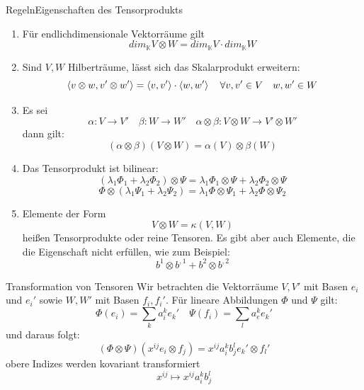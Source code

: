 \begin{Satz}{Regeln}{Eigenschaften des Tensorprodukts}
\begin{enumerate}
    \item Für endlichdimensionale Vektorräume gilt
    $$dim_{\mathbb{K}}V\otimes W = dim_{\mathbb{K}} V \cdot dim_{\mathbb{K}} W$$
    \item Sind $V,W$ Hilberträume, lässt sich das Skalarprodukt erweitern:
    $$\braket{v\otimes w, v'\otimes w'}=\braket{v,v'}\cdot \braket{w, w'} \quad \forall v,v'\in V\quad w,w'\in W$$
    \item Es sei $$\alpha: V\rightarrow V' \quad \beta:W\rightarrow W' \quad \alpha\otimes\beta: V\otimes W \rightarrow V'\otimes W'$$
    dann gilt:
    $$(\alpha\otimes\beta)(V\otimes W)=\alpha(V)\otimes \beta(W)$$
    \item Das Tensorprodukt ist bilinear:
    $$(\lambda_1\Phi_1+\lambda_2\Phi_2)\otimes \Psi = \lambda_1\Phi_1 \otimes \Psi + \lambda_2\Phi_2 \otimes \Psi$$
    $$\Phi\otimes (\lambda_1\Psi_1+ \lambda_2\Psi_2) = \lambda_1\Phi \otimes \Psi_1 + \lambda_2\Phi \otimes \Psi_2$$
    \item Elemente der Form
    $$V\otimes W=\kappa(V,W)$$
    heißen Tensorprodukte oder reine Tensoren. Es gibt aber auch Elemente, die die Eigenschaft nicht erfüllen, wie zum Beispiel:
    $$b^1\otimes b^{,1}+b^2\otimes b^{,2}$$
\end{enumerate}
\end{Satz}
\begin{Def}{Transformation von Tensoren}
    Wir betrachten die Vektorräume $V,V'$ mit Basen $e_i$ und $e_i'$ sowie $W, W'$ mit Basen $f_i, f_i'$. Für lineare Abbildungen $\Phi$ und $\Psi$ gilt:
    $$\Phi(e_i)=\sum_k a^k _i e_k' \quad \Psi(f_i)=\sum_l a^k _e e_k'$$
    und daraus folgt:
    $$(\Phi \otimes \Psi)(x^{ij}e_i\otimes f_j) =x^{ij}a^k_i b^l_j e_k'\otimes f_l'$$
    obere Indizes werden kovariant transformiert
    $$x^{ij}\mapsto x^{ij}a^k_ib^l_j$$
\end{Def}

